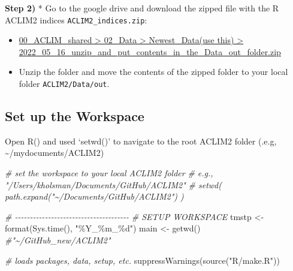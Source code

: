 \documentclass[
]{article}
\newenvironment{Shaded}{\begin{snugshade}}{\end{snugshade}}
\newcommand{\CommentTok}[1]{\textcolor[rgb]{0.56,0.35,0.01}{\textit{#1}}}
\newcommand{\FunctionTok}[1]{\textcolor[rgb]{0.00,0.00,0.00}{#1}}
\newcommand{\NormalTok}[1]{#1}
\newcommand{\OtherTok}[1]{\textcolor[rgb]{0.56,0.35,0.01}{#1}}
\newcommand{\StringTok}[1]{\textcolor[rgb]{0.31,0.60,0.02}{#1}}
\begin{document}
\textbf{Step 2)} * Go to the google drive and download the zipped file
with the R ACLIM2 indices \texttt{ACLIM2\_indices.zip}:

\begin{itemize}
\item
  \href{https://drive.google.com/drive/folders/11BQEfNEl9vvrN-V0LgS67XS4aLE9pNzz}{00\_ACLIM\_shared
  \textgreater{} 02\_Data \textgreater{} Newest\_Data(use this)
  \textgreater{}
  2022\_05\_16\_unzip\_and\_put\_contents\_in\_the\_Data\_out\_folder.zip}
\item
  Unzip the folder and move the contents of the zipped folder to your
  local folder \texttt{ACLIM2/Data/out}.
\end{itemize}

\hypertarget{set-up-the-workspace}{%
\subsection{Set up the Workspace}\label{set-up-the-workspace}}

Open R() and used `setwd()' to navigate to the root ACLIM2 folder (.e.g,
\textasciitilde/mydocuments/ACLIM2)

\begin{Shaded}
\begin{Highlighting}[]
    \CommentTok{\# set the workspace to your local ACLIM2 folder}
    \CommentTok{\# e.g., "/Users/kholsman/Documents/GitHub/ACLIM2"}
    \CommentTok{\# setwd( path.expand("\textasciitilde{}/Documents/GitHub/ACLIM2") )}
   
    \CommentTok{\# {-}{-}{-}{-}{-}{-}{-}{-}{-}{-}{-}{-}{-}{-}{-}{-}{-}{-}{-}{-}{-}{-}{-}{-}{-}{-}{-}{-}{-}{-}{-}{-}{-}{-}{-}{-}{-}{-}}
    \CommentTok{\# SETUP WORKSPACE}
\NormalTok{    tmstp  }\OtherTok{\textless{}{-}} \FunctionTok{format}\NormalTok{(}\FunctionTok{Sys.time}\NormalTok{(), }\StringTok{"\%Y\_\%m\_\%d"}\NormalTok{)}
\NormalTok{    main   }\OtherTok{\textless{}{-}} \FunctionTok{getwd}\NormalTok{()  }\CommentTok{\#"\textasciitilde{}/GitHub\_new/ACLIM2"}
    
    \CommentTok{\# loads packages, data, setup, etc.}
    \FunctionTok{suppressWarnings}\NormalTok{(}\FunctionTok{source}\NormalTok{(}\StringTok{"R/make.R"}\NormalTok{))}
\end{Highlighting}
\end{Shaded}
\end{document}
